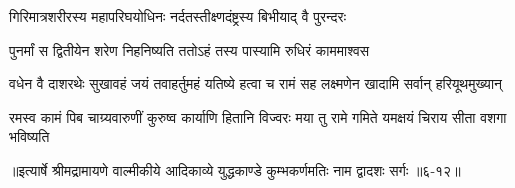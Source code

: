 \twolineshloka
{गिरिमात्रशरीरस्य महापरिघयोधिनः}
{नर्दतस्तीक्ष्णदंष्ट्रस्य बिभीयाद् वै पुरन्दरः} %

\twolineshloka
{पुनर्मां स द्वितीयेन शरेण निहनिष्यति}
{ततोऽहं तस्य पास्यामि रुधिरं काममाश्वस} %

\twolineshloka
{वधेन वै दाशरथेः सुखावहं जयं तवाहर्तुमहं यतिष्ये}
{हत्वा च रामं सह लक्ष्मणेन खादामि सर्वान् हरियूथमुख्यान्} %

\twolineshloka
{रमस्व कामं पिब चाग्र्यवारुणीं कुरुष्व कार्याणि हितानि विज्वरः}
{मया तु रामे गमिते यमक्षयं चिराय सीता वशगा भविष्यति} %


॥इत्यार्षे श्रीमद्रामायणे वाल्मीकीये आदिकाव्ये युद्धकाण्डे कुम्भकर्णमतिः नाम द्वादशः सर्गः ॥६-१२॥
